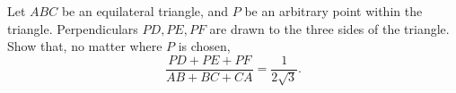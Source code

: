Let $ABC$ be an equilateral triangle, and $P$ be an arbitrary point within the triangle. Perpendiculars $PD,PE,PF$ are drawn to the three sides of the triangle. Show that, no matter where $P$ is chosen, \[ \frac{PD+PE+PF}{AB+BC+CA}=\frac{1}{2\sqrt{3}}. \]
